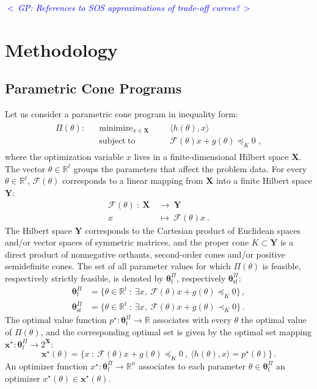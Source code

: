 \documentclass{article}
\DeclareMathOperator*{\minimize}{minimize}
\DeclareMathOperator*{\subj}{subject\;to}
\newcommand{\commentGP}[1]{\noindent \textcolor{blue}{\emph{$<\,$GP: #1$\,>$}}}%
\newcommand{\R}{\mathbb{R}}         %
\newcommand{\opt}{\star}                    %
\newcommand{\feas}{\mathrm{f}}              %
\newcommand{\strfeas}{\mathrm{sf}}          %
\newcommand{\ppar}{\theta}                          %
\newcommand{\Ppar}{{\bm{\theta}}}                   %
\newcommand{\X}{\mathbf{X}}                         %
\newcommand{\Y}{\mathbf{Y}}                         %
\newcommand{\calF}{\mathcal{F}}                     %
\newcommand{\Pfeas}{\Ppar^\Pi_\feas}                %
\newcommand{\Pstrfeas}{\Ppar^\Pi_\strfeas}          %
\begin{document}
\commentGP{References to SOS approximations of trade-off curves?}



\section{Methodology}\label{sec:methodology}


\subsection{Parametric Cone Programs}\label{subsec:parametric_program}

Let us consider a parametric cone program in inequality form:
\begin{gather}\label{eq:parametric_primal}
\begin{aligned}
\Pi(\ppar): && \minimize_{x\in\X} &&& \langle h(\ppar), x \rangle\\
            && \subj              &&& \calF(\ppar)x +g(\ppar)\preceq_K 0 \;,%
\end{aligned}
\end{gather}
where the optimization variable $x$ lives in a finite-dimensional Hilbert space $\X$. The vector $\ppar\in\R^t$ groups the parameters that affect the problem data. For every $\ppar\in\R^t$, $\calF(\ppar)$ corresponds to a linear mapping from $\X$ into a finite Hilbert space $\Y$:
\begin{align*}
\calF(\ppar) ~:~ \X~ &\rightarrow~ \Y \\
                  x~ &\mapsto~ \calF(\ppar)x ~.
\end{align*}
The Hilbert space $\Y$ corresponds to the Cartesian product of Euclidean spaces and/or vector spaces of symmetric matrices, and the proper cone $K\subset\Y$ is a direct product of nonnegative orthants, second-order cones and/or positive semidefinite cones. The set of all parameter values for which $\Pi(\ppar)$ is feasible, respectively strictly feasible, is denoted by $\Pfeas$, respectively $\Pstrfeas$:
\begin{align*}
\Pfeas    &= \{\ppar\in\R^t ~:~ \exists x ,~ \calF(\ppar)x+g(\ppar)\preceq_K 0 \}\,,\\%
\Pstrfeas &= \{\ppar\in\R^t ~:~ \exists x ,~ \calF(\ppar)x+g(\ppar)\prec_K 0 \}\,.%
\end{align*}
The optimal value function $p^\opt:\Pfeas\rightarrow\R$ associates with every $\ppar$ the optimal value of $\Pi(\ppar)$, and the corresponding optimal set is given by the optimal set mapping $\bm{x}^\opt:\Pfeas\rightarrow 2^{\X}$:
\[ \bm{x}^\opt(\ppar) = \{x ~:~ \calF(\ppar)x+g(\ppar)\preceq_K 0 ~,~ \langle h(\ppar), x \rangle = p^\opt(\ppar)\} \,.%
\]
An optimizer function $x^\opt:\Pfeas\rightarrow\R^n$ associates to each parameter $\ppar\in\Pfeas$ an optimizer $x^\opt(\ppar)\in \bm{x}^\opt(\ppar)$.
\end{document}
